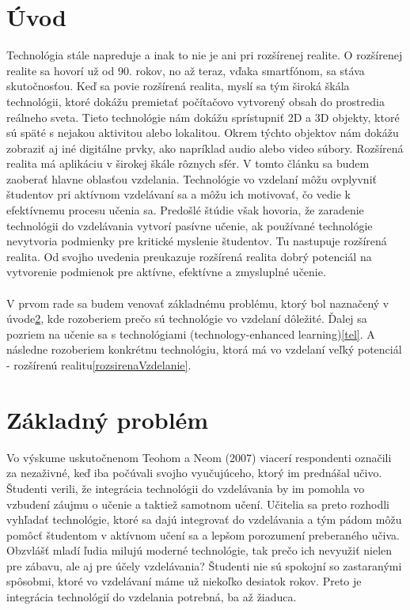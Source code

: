 \documentclass[10pt,oneside,slovak,a4paper]{article}
\begin{document}
\section{Úvod}
Technológia stále napreduje a inak to nie je ani pri rozšírenej realite.  
O rozšírenej realite sa hovorí už od 90. rokov, no až teraz, vďaka smartfónom, sa stáva skutočnosťou.\cite{Yuen2011} 
Keď sa povie rozšírená realita, myslí sa tým široká škála technológii, ktoré dokážu premietať počítačovo vytvorený obsah do prostredia reálneho sveta.\cite{Yuen2011}
Tieto technológie nám dokážu sprístupniť 2D a 3D objekty, ktoré sú späté s nejakou aktivitou alebo lokalitou. 
Okrem týchto objektov nám dokážu zobraziť aj iné digitálne prvky, ako napríklad audio alebo video súbory.\cite{Yuen2011} 
Rozšírená realita má aplikáciu v širokej škále rôznych sfér. V tomto článku sa budem zaoberať hlavne oblasťou vzdelania. 
Technológie vo vzdelaní môžu ovplyvniť študentov pri aktívnom vzdelávaní sa a môžu ich motivovať, čo vedie k efektívnemu procesu učenia sa.\cite{Saidin2015}
Predošlé štúdie však hovoria, že zaradenie technológii do vzdelávania vytvorí pasívne učenie, ak používané technológie nevytvoria podmienky pre kritické myslenie študentov.\cite{Saidin2015}
Tu nastupuje rozšírená realita.
Od svojho uvedenia preukazuje rozšírená realita dobrý potenciál na vytvorenie podmienok pre aktívne, efektívne a zmysluplné učenie.\cite{Saidin2015}
\\\\V prvom rade sa budem venovať základnému problému, ktorý bol naznačený v úvode\ref{zakladnyProblem}, kde rozoberiem prečo sú technológie vo vzdelaní dôležité.
Ďalej sa pozriem na učenie sa s technológiami (technology-enhanced learning)\ref{tel}.
A následne rozoberiem konkrétnu technológiu, ktorá má vo vzdelaní veľký potenciál - rozšírenú realitu\ref{rozsirenaVzdelanie}.


\section{Základný problém} \label{zakladnyProblem}
Vo výskume uskutočnenom Teohom a Neom (2007) viacerí respondenti označili za nezaživné, keď iba počúvali svojho vyučujúceho, ktorý im prednášal učivo.\cite{Saidin2015}
Študenti verili, že integrácia technológii do vzdelávania by im pomohla vo vzbudení záujmu o učenie a taktiež samotnom učení. 
Učitelia sa preto rozhodli vyhľadať technológie, ktoré sa dajú integrovať do vzdelávania a tým pádom môžu pomôcť študentom v aktívnom učení sa a lepšom porozumení preberaného učiva.
Obzvlášť mladí ľudia milujú moderné technológie, tak prečo ich nevyužiť nielen pre zábavu, ale aj pre účely vzdelávania? 
Študenti nie sú spokojní so zastaranými spôsobmi, ktoré vo vzdelávaní máme už niekoľko desiatok rokov.
Preto je integrácia technológií do vzdelania potrebná, ba až žiaduca. 
\end{document}
